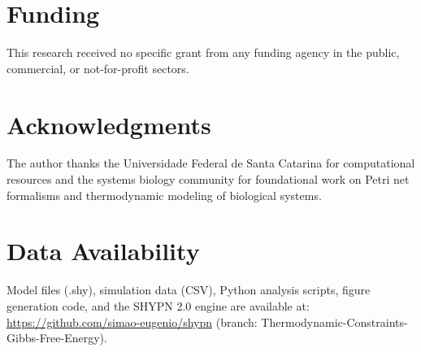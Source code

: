\documentclass[twocolumn,11pt]{article}
\begin{document}
\section*{Funding}

This research received no specific grant from any funding agency in the public, commercial, or not-for-profit sectors.

\section*{Acknowledgments}

The author thanks the Universidade Federal de Santa Catarina for computational resources and the systems biology community for foundational work on Petri net formalisms and thermodynamic modeling of biological systems.

\section*{Data Availability}

Model files (.shy), simulation data (CSV), Python analysis scripts, figure generation code, and the SHYPN 2.0 engine are available at: \url{https://github.com/simao-eugenio/shypn} (branch: Thermodynamic-Constraints-Gibbs-Free-Energy).
\end{document}
